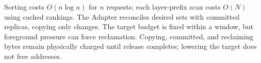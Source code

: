 Sorting costs $O(n\log n)$ for $n$ requests; each layer-prefix scan costs
$O(N)$ using cached rankings. The Adapter reconciles desired sets with
committed replicas, copying only changes. The target budget is fixed
within a window, but foreground pressure can force reclamation.
Copying, committed, and reclaiming bytes remain physically charged
until release completes; lowering the target does not free addresses.
